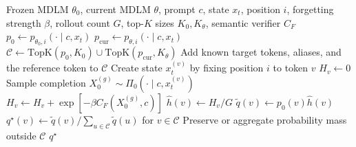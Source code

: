 \documentclass[10pt]{article}
\newcommand{\1}{\mathbb{I}}
\begin{document}
\begin{algorithm}[t]
\caption{Estimate a safe token target at one MDLM state}
\label{alg:safe_target}
\begin{algorithmic}[1]
\Require Frozen MDLM $\theta_0$, current MDLM $\theta$, prompt $c$, state $x_t$, position $i$, forgetting strength $\beta$, rollout count $G$, top-$K$ sizes $K_0,K_\theta$, semantic verifier $C_F$
\State $p_0\gets p_{\theta_0,i}(\cdot\mid c,x_t)$
\State $p_{\mathrm{cur}}\gets p_{\theta,i}(\cdot\mid c,x_t)$
\State $\mathcal C\gets \mathrm{TopK}(p_0,K_0)\cup\mathrm{TopK}(p_{\mathrm{cur}},K_\theta)$
\State Add known target tokens, aliases, and the reference token to $\mathcal C$
    \State Create state $x_t^{(v)}$ by fixing position $i$ to token $v$
    \State $H_v\gets 0$
        \State Sample completion $X_0^{(g)}\sim\Pi_0(\cdot\mid c,x_t^{(v)})$
        \State $H_v\gets H_v+\exp[-\beta C_F(X_0^{(g)},c)]$
    \EndFor
    \State $\widehat h(v)\gets H_v/G$
    \State $\widetilde q(v)\gets p_0(v)\widehat h(v)$
\EndFor
\State $q^\star(v)\gets \widetilde q(v)/\sum_{u\in\mathcal C}\widetilde q(u)$ for $v\in\mathcal C$
\State Preserve or aggregate probability mass outside $\mathcal C$
\State \Return $q^\star$
\end{algorithmic}
\end{algorithm}
\end{document}
